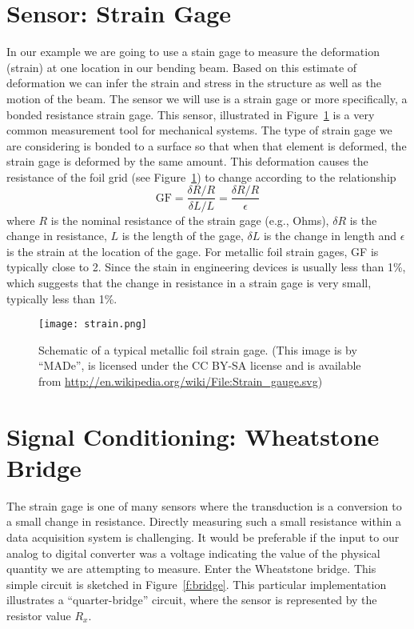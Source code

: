 \section{Sensor: Strain Gage}
In our example we are going to use a stain gage to measure the deformation (strain) at one location in our bending beam.  Based on this estimate of deformation we can infer the strain and stress in the structure as well as the motion of the beam.  The sensor we will use is a \gls{strain gage} or more specifically, a bonded resistance strain gage.  This sensor, illustrated in Figure~\ref{f:strain} is a very common measurement tool for mechanical systems.  The type of strain gage we are considering is bonded to a surface so that when that element is deformed, the strain gage is deformed by the same amount.  This deformation causes the resistance of the foil grid (see Figure~\ref{f:strain}) to change according to the relationship
\begin{equation}\label{e:gage}
\mathrm{GF} = \frac{\delta R / R}{\delta L / L}=\frac{\delta R /R}{\epsilon}
\end{equation}
where $R$ is the nominal resistance of the strain gage (e.g., \unit[120]{Ohms}), $\delta R$ is the change in resistance, $L$ is the length of the gage, $\delta L$ is the change in length and $\epsilon$ is the strain at the location of the gage.  For metallic foil strain gages, GF is typically close to 2.  Since the stain in engineering devices is usually less than 1\%, which suggests that the change in resistance in a strain gage is very small, typically less than 1\%.  

\begin{figure}[hb!]
\centerline{
{\texttt{[image: strain.png]}}}
\caption{Schematic of a typical metallic foil strain gage.  (This image is by ``MADe'', is licensed under the CC BY-SA license and is available from \url{http://en.wikipedia.org/wiki/File:Strain_gauge.svg}) }
\label{f:strain}
\end{figure}


\section{Signal Conditioning: Wheatstone Bridge}
The strain gage is one of many sensors where the transduction is a conversion to a small change in resistance.  Directly measuring such a small resistance within a data acquisition system is challenging.  It would be preferable if the input to our analog to digital converter was a voltage indicating the value of the physical quantity we are attempting to measure.  Enter the Wheatstone bridge.  This simple circuit is sketched in Figure~\ref{f:bridge}.  This particular implementation illustrates a ``quarter-bridge'' circuit, where the sensor is represented by the resistor value $R_x$.

